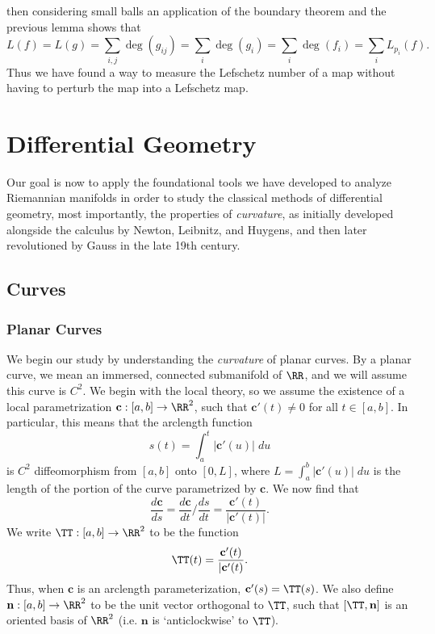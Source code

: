 then considering small balls an application of the boundary theorem and the previous lemma shows that
%
\[ L(f) = L(g) = \sum_{i,j} \deg(g_{ij}) = \sum_i \deg(g_i) = \sum_i \deg(f_i) = \sum_i L_{p_i}(f). \]
%
Thus we have found a way to measure the Lefschetz number of a map without having to perturb the map into a Lefschetz map.










\part{Differential Geometry}

Our goal is now to apply the foundational tools we have developed to analyze Riemannian manifolds in order to study the classical methods of differential geometry, most importantly, the properties of \emph{curvature}, as initially developed alongside the calculus by Newton, Leibnitz, and Huygens, and then later revolutioned by Gauss in the late 19th century.

\chapter{Curves}






\section{Planar Curves}

We begin our study by understanding the \emph{curvature} of planar curves. By a planar curve, we mean an immersed, connected submanifold of $\RR$, and we will assume this curve is $C^2$. We begin with the local theory, so we assume the existence of a local parametrization $\mathbf{c}: [a,b] \to \RR^2$, such that $\mathbf{c}'(t) \neq 0$ for all $t \in [a,b]$. In particular, this means that the arclength function
%
\[ s(t) = \int_a^t |\mathbf{c}'(u)|\; du \]
%
is $C^2$ diffeomorphism from $[a,b]$ onto $[0,L]$, where $L = \int_a^b |\mathbf{c}'(u)|\; du$ is the length of the portion of the curve parametrized by $\mathbf{c}$. We now find that
%
\[ \frac{d\mathbf{c}}{ds} = \frac{d\mathbf{c}}{dt} \bigg/ \frac{ds}{dt} = \frac{\mathbf{c}'(t)}{|\mathbf{c}'(t)|}. \]
%
We write $\TT: [a,b] \to \RR^2$ to be the function
%
\[ \TT(t) = \frac{\mathbf{c}'(t)}{|\mathbf{c}'(t)}. \]
%
Thus, when $\mathbf{c}$ is an arclength parameterization, $\mathbf{c}'(s) = \TT(s)$. We also define $\mathbf{n}: [a,b] \to \RR^2$ to be the unit vector orthogonal to $\TT$, such that $[\TT, \mathbf{n}]$ is an oriented basis of $\RR^2$ (i.e. $\mathbf{n}$ is `anticlockwise' to $\TT$).


